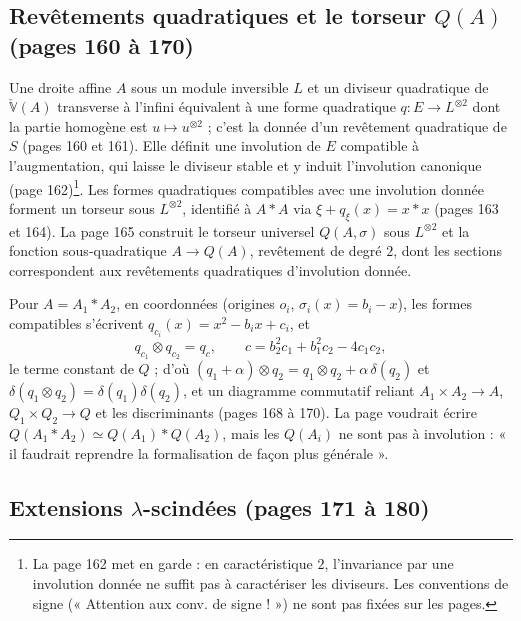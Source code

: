 \documentclass[11pt,a4paper]{article}
\begin{document}
\subsection*{Revêtements quadratiques et le torseur $Q(A)$ (pages 160 à 170)}

Une droite affine $A$ sous un module inversible $L$ et un diviseur
quadratique de $\check{\mathbb{V}}(A)$ transverse à l'infini équivalent à une
forme quadratique $q : E \to L^{\otimes 2}$ dont la partie homogène est $u
\mapsto u^{\otimes 2}$ ; c'est la donnée d'un revêtement quadratique de $S$
(pages 160 et 161). Elle définit une involution de $E$ compatible à
l'augmentation, qui laisse le diviseur stable et y induit l'involution canonique
(page 162)\footnote{La page 162 met en garde : en caractéristique $2$,
l'invariance par une involution donnée ne suffit pas à caractériser les
diviseurs. Les conventions de signe (« Attention aux conv. de signe ! ») ne sont
pas fixées sur les pages.}. Les formes quadratiques compatibles avec une
involution donnée forment un torseur sous $L^{\otimes 2}$, identifié à $A * A$
via $\xi + q_\xi(x) = x * x$ (pages 163 et 164). La page 165 construit le
torseur universel $Q(A, \sigma)$ sous $L^{\otimes 2}$ et la fonction
sous-quadratique $A \to Q(A)$, revêtement de degré $2$, dont les sections
correspondent aux revêtements quadratiques d'involution donnée.

Pour $A = A_1 * A_2$, en coordonnées (origines $o_i$, $\sigma_i(x) = b_i -
x$), les formes compatibles s'écrivent $q_{c_i}(x) = x^2 - b_ix + c_i$, et
\[
  q_{c_1} \otimes q_{c_2} = q_c,\qquad c = b_2^2c_1 + b_1^2c_2 - 4c_1c_2,
\]
le terme constant de $Q$ ; d'où $(q_1 + \alpha) \otimes q_2 = q_1 \otimes q_2 +
\alpha\,\delta(q_2)$ et $\delta(q_1 \otimes q_2) = \delta(q_1)\delta(q_2)$, et un
diagramme commutatif reliant $A_1 \times A_2 \to A$, $Q_1 \times Q_2 \to Q$ et
les discriminants (pages 168 à 170). La page voudrait écrire $Q(A_1 * A_2) \simeq
Q(A_1) * Q(A_2)$, mais les $Q(A_i)$ ne sont pas à involution : « il faudrait
reprendre la formalisation de façon plus générale ».

\subsection*{Extensions $\lambda$-scindées (pages 171 à 180)}
\end{document}
